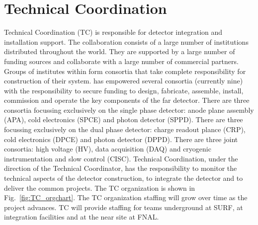 \chapter{Technical Coordination}
\label{ch:fdsp-coord}

Technical Coordination (TC) is responsible for detector integration
and installation support. 
The  collaboration consists of a large number of
institutions distributed throughout the world. They are supported by a
large number of funding sources and collaborate with a large number of
commercial partners. Groups of institutes within  form
consortia that take complete responsibility for construction of their
system.   has empowered several consortia (currently nine)
with the responsibility to secure funding to design, fabricate,
assemble, install, commission and operate the key components of the
 far detector. There are three consortia focussing
exclusively on the single phase detector: anode plane assembly (APA),
cold electronics (SPCE) and photon detector (SPPD). There are three
focussing exclusively on the dual phase detector: charge readout
plance (CRP), cold electronics (DPCE) and photon detector
(DPPD). There are three joint consortia: high voltage (HV), data
acquisition (DAQ) and cryogenic instrumentation and slow control
(CISC).   Technical Coordination, under the direction of
the  Technical Coordinator, has the responsibility to
monitor the technical aspects of the detector construction, to
integrate the detector and to deliver the common projects. The
 TC organization is shown in Fig.~\ref{fig:TC_orgchart}.
The TC organization staffing will grow over time as the project
advances. TC will provide staffing for teams underground at SURF, at
integration facilities and at the near site at FNAL.
